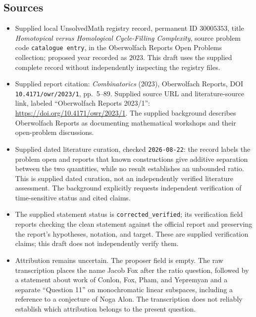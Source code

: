 \documentclass[11pt]{article}
\begin{document}
\subsection{Sources}
\begin{itemize}
\item Supplied local UnsolvedMath registry record, permanent ID \(30005353\), title \emph{Homotopical versus Homological Cycle-Filling Complexity}, source problem code \texttt{catalogue entry}, in the Oberwolfach Reports Open Problems collection; proposed year recorded as \(2023\). This draft uses the supplied complete record without independently inspecting the registry files.
\item Supplied report citation: \emph{Combinatorics} (2023), Oberwolfach Reports, DOI \texttt{10.4171/owr/2023/1}, pp.\ 5--89. Supplied source URL and literature-source link, labeled ``Oberwolfach Reports 2023/1'': \url{https://doi.org/10.4171/owr/2023/1}. The supplied background describes Oberwolfach Reports as documenting mathematical workshops and their open-problem discussions.
\item Supplied dated literature curation, checked \texttt{2026-08-22}: the record labels the problem open and reports that known constructions give additive separation between the two quantities, while no result establishes an unbounded ratio. This is supplied dated curation, not an independently verified literature assessment. The background explicitly requests independent verification of time-sensitive status and cited claims.
\item The supplied statement status is \texttt{corrected\_verified}; its verification field reports checking the clean statement against the official report and preserving the report's hypotheses, notation, and target. These are supplied verification claims; this draft does not independently verify them.
\item Attribution remains uncertain. The proposer field is empty. The raw transcription places the name Jacob Fox after the ratio question, followed by a statement about work of Conlon, Fox, Pham, and Yepremyan and a separate ``Question 11'' on monochromatic linear subspaces, including a reference to a conjecture of Noga Alon. The transcription does not reliably establish which attribution belongs to the present question.
\end{itemize}
\end{document}
